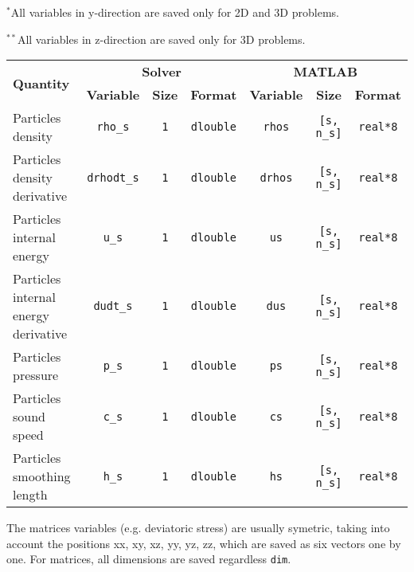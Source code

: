 $^*$All variables in y-direction are saved only for 2D and 3D problems.

$^{**}$All variables in z-direction are saved only for 3D problems.

{\footnotesize
\begin{tabular}{|l|c|c|c|c|c|c|}%
\hline
\multirow{2}{*}{\bf Quantity} & \multicolumn{3}{c|}{\bf Solver} &\multicolumn{3}{c|}{\bf MATLAB} \\ \cline{2-7}
& {\bf Variable} & {\bf Size} & {\bf Format} & {\bf Variable} & {\bf Size} & {\bf Format} \\ \hline
Particles density & \texttt{rho\_s} & \texttt{1} & \texttt{dlouble} & \texttt{rhos} & \texttt{[s, n\_s]} & \texttt{real*8} \\ \hline
Particles density derivative & \texttt{drhodt\_s} & \texttt{1} & \texttt{dlouble} & \texttt{drhos} & \texttt{[s, n\_s]} & \texttt{real*8} \\ \hline
Particles internal energy & \texttt{u\_s} & \texttt{1} & \texttt{dlouble} & \texttt{us} & \texttt{[s, n\_s]} & \texttt{real*8} \\ \hline
Particles internal energy derivative & \texttt{dudt\_s} & \texttt{1} & \texttt{dlouble} & \texttt{dus} & \texttt{[s, n\_s]} & \texttt{real*8} \\ \hline
Particles pressure & \texttt{p\_s} & \texttt{1} & \texttt{dlouble} & \texttt{ps} & \texttt{[s, n\_s]} & \texttt{real*8} \\ \hline
Particles sound speed & \texttt{c\_s} & \texttt{1} & \texttt{dlouble} & \texttt{cs} & \texttt{[s, n\_s]} & \texttt{real*8} \\ \hline
Particles smoothing length & \texttt{h\_s} & \texttt{1} & \texttt{dlouble} & \texttt{hs} & \texttt{[s, n\_s]} & \texttt{real*8} \\ \hline
\end{tabular}
}

The matrices variables (e.g. deviatoric stress) are usually symetric, taking into account the positions xx, xy, xz, yy, yz, zz, which are saved as six vectors one by one. For matrices, all dimensions are saved regardless \texttt{dim}.

